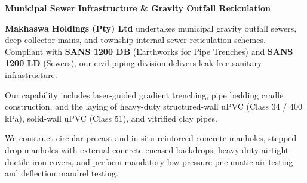 \documentclass[a4paper,11pt]{article}
\begin{document}
\noindent
\begin{minipage}[t]{0.62\textwidth}
    \vspace{0pt}
    {\large\bfseries\color{mhnavy} Municipal Sewer Infrastructure \& Gravity Outfall Reticulation}
    \vspace{0.12cm}

    {\fontsize{9pt}{13pt}\selectfont\color{mhtext}
    \textbf{Makhaswa Holdings (Pty) Ltd} undertakes municipal gravity outfall sewers, deep collector mains, and township internal sewer reticulation schemes. Compliant with \textbf{SANS 1200 DB} (Earthworks for Pipe Trenches) and \textbf{SANS 1200 LD} (Sewers), our civil piping division delivers leak-free sanitary infrastructure.
    }

    \vspace{0.22cm}

    {\fontsize{9pt}{13pt}\selectfont\color{mhtext}
    Our capability includes laser-guided gradient trenching, pipe bedding cradle construction, and the laying of heavy-duty structured-wall uPVC (Class 34 / 400 kPa), solid-wall uPVC (Class 51), and vitrified clay pipes.
    }

    \vspace{0.22cm}

    {\fontsize{9pt}{13pt}\selectfont\color{mhtext}
    We construct circular precast and in-situ reinforced concrete manholes, stepped drop manholes with external concrete-encased backdrops, heavy-duty airtight ductile iron covers, and perform mandatory low-pressure pneumatic air testing and deflection mandrel testing.
    }
\end{minipage}
\hfill
\end{document}

